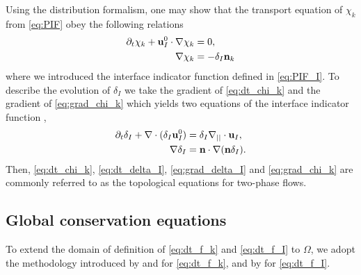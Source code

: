 Using the distribution formalism, one may show that the transport equation of $\chi_k$ from \ref{eq:PIF} obey the following relations \citep{drew1983mathematical} 
\begin{align}
    \partial_t \chi_k
    + \textbf{u}_I^0 \cdot \mathbf{\nabla} \chi_k
    &= 0,
    \label{eq:dt_chi_k}\\
    \label{eq:grad_chi_k}
    \mathbf{\nabla} \chi_k
    &= - \delta_I \textbf{n}_k
\end{align}
where we introduced the interface indicator function defined in \ref{eq:PIF_I}. 
To describe the evolution of $\delta_I$ we take the gradient of \ref{eq:dt_chi_k} and the gradient of \ref{eq:grad_chi_k} which yields two equations of the interface indicator function \citep{morel2007surface},
\begin{align}
    \partial_t \delta_I
    + \mathbf{\nabla}\cdot (\delta_I \textbf{u}_I^0)
    &= \delta_I \mathbf{\nabla}_{||}\cdot \textbf{u}_I,
    \label{eq:dt_delta_I}\\
    \mathbf{\nabla}\delta_I 
    &= \textbf{n} \cdot \mathbf{\nabla} (\textbf{n} \delta_I).
    \label{eq:grad_delta_I}
\end{align}
Then, \ref{eq:dt_chi_k}, \ref{eq:dt_delta_I}, \ref{eq:grad_delta_I} and \ref{eq:grad_chi_k} are commonly referred to as the topological equations for two-phase flows.


\subsection{Global conservation equations}

To extend the domain of definition of \ref{eq:dt_f_k} and \ref{eq:dt_f_I} to $\Omega$, we adopt the methodology introduced by \citet{drew1983mathematical} and \citet{kataoka1986local} for \ref{eq:dt_f_k}, and by \citet[Appendix 2]{marle1982macroscopic} for \ref{eq:dt_f_I}.

